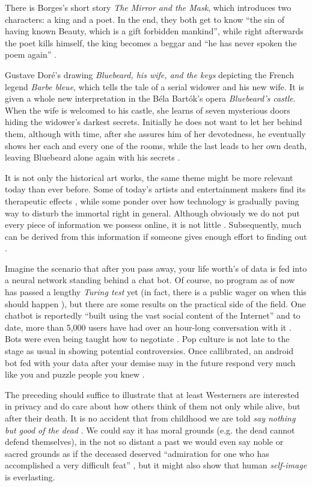 \documentclass[a4paper]{article}
\begin{document}
There is Borges's short story \textit{The Mirror and the Mask}, which introduces two characters: a king and a poet. In the end, they both get to know ``the sin of having known Beauty, which is a gift forbidden mankind'', while right afterwards the poet kills himself, the king becomes a beggar and ``he has never spoken the poem again'' \cite{borges}.

Gustave Doré's drawing \textit{Bluebeard, his wife, and the keys} \cite{dore} depicting the French legend \textit{Barbe bleue}, which tells the tale of a serial widower and his new wife. It is given a whole new interpretation in the Béla Bartók's opera \textit{Bluebeard's castle}.
When the wife is welcomed to his castle, she learns of seven mysterious doors hiding the widower's darkest secrets.
Initially he does not want to let her behind them, although with time, after she assures him of her devotedness, he eventually shows her each and every one of the rooms, while the last leads to her own death, leaving Bluebeard alone again with his secrets \cite{keiser}.

It is not only the historical art works, the same theme might be more relevant today than ever before. Some of today's artists and entertainment makers find its therapeutic effects \cite{sophie-calle}, while some ponder over how technology is gradually paving way to disturb the immortal right in general.
Although obviously we do not put every piece of information we possess online, it is not little \cite{marr}. Subsequently, much can be derived from this information if someone gives enough effort to finding out \cite{like, datascience}.

Imagine the scenario that after you pass away, your life worth's of data is fed into a neural network standing behind a chat bot. Of course, no program as of now has passed a lengthy \textit{Turing test} yet (in fact, there is a public wager on when this should happen \cite{longbet}), but there are some results on the practical side of the field.
One chatbot is reportedly ``built using the vast social content of the Internet'' and to date, more than 5,000 users have had over an hour-long conversation with it \cite{microsoft}. Bots were even being taught how to negotiate \cite{fbbots}.
Pop culture is not late to the stage as usual in showing potential controversies. Once callibrated, an android bot fed with your data after your demise may in the future respond very much like you and puzzle people you knew \cite{blackmirror}.

\medskip
The preceding should suffice to illustrate that at least Westerners are interested in privacy and do care about how others think of them not only while alive, but after their death. It is no accident that from childhood we are told \textit{say nothing but good of the dead} \cite{collins}.
We could say it has moral grounds (e.g. the dead cannot defend themselves), in the not so distant a past we would even say noble or sacred grounds as if the deceased deserved ``admiration for one who has accomplished a very difficult feat'' \cite{freud}, but it might also show that human \emph{self-image} is everlasting.
\end{document}
